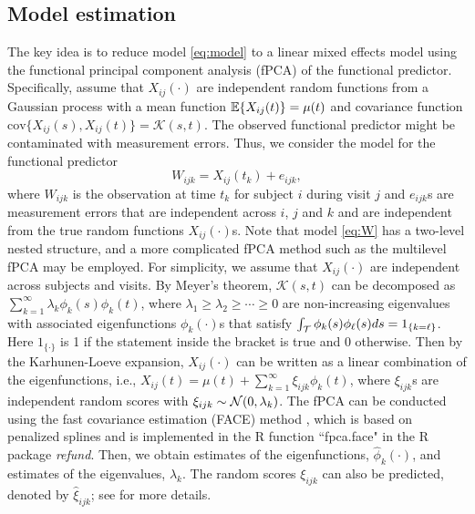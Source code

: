 \subsection{Model estimation}
The key idea is  to reduce model \eqref{eq:model}
to a linear mixed effects model using the functional principal component 
analysis (fPCA) of the functional predictor.
Specifically,  assume that $X_{ij}(\cdot)$ are independent random functions from a Gaussian process
with a mean function $\mathbb{E}\{X_{ij}(t)\}=\mu(t)$ and covariance function
$\text{cov}\{X_{ij}(s), X_{ij}(t)\}= \mathcal{K}(s,t)$.
The observed functional predictor might be contaminated with measurement errors. Thus, we consider
the model for the functional predictor
\begin{equation}
\label{eq:W}
W_{ijk} = X_{ij}(t_k) + e_{ijk},
\end{equation}
where $W_{ijk}$ is the observation at time $t_k$ for subject $i$ during visit $j$ and
$e_{ijk}$s are measurement errors that are independent across $i$, $j$ and $k$ and
are independent from the true random functions $X_{ij}(\cdot)$s.
Note that model \eqref{eq:W} has a two-level nested structure, and
a more complicated fPCA method such as the multilevel fPCA \cite{di2009multilevel}
may be employed. For simplicity, we assume that $X_{ij}(\cdot)$ are independent across subjects and visits.
By Meyer's theorem, $\mathcal{K}(s,t)$ can be decomposed as $\sum_{k=1}^{\infty} \lambda_k \phi_k(s)\phi_k(t)$,
where $\lambda_1\geq\lambda_2\geq\cdots \geq 0$ are non-increasing eigenvalues with associated
eigenfunctions $\phi_k(\cdot)$s that satisfy $\int_{\mathcal{T}} \phi_k(s)\phi_\ell(s) ds = 1_{\{k=\ell\}}$.
Here $1_{\{\cdot\}}$ is 1 if the statement inside the bracket is true and 0 otherwise.
Then by the Karhunen-Loeve expansion, $X_{ij}(\cdot)$ can be written as a linear combination of the eigenfunctions,
i.e., $X_{ij}(t) = \mu(t) + \sum_{k=1}^{\infty}\xi_{ijk} \phi_k(t)$, where $\xi_{ijk}$s are independent
 random scores with $\xi_{ijk}\sim \mathcal{N}(0,\lambda_k)$.
The fPCA can be conducted using the fast covariance estimation (FACE) method  \cite{xiao2016fast},
which is based on penalized splines and is implemented in the R function ``fpca.face" in the R package {\it refund}.
Then, we obtain estimates of the eigenfunctions, $\hat{\phi}_k(\cdot)$, and estimates of the eigenvalues, $\hat{\lambda}_k$.
The random scores $\xi_{ijk}$ can also be predicted, denoted by $\hat{\xi}_{ijk}$; see \cite{xiao2016fast} for more details.

